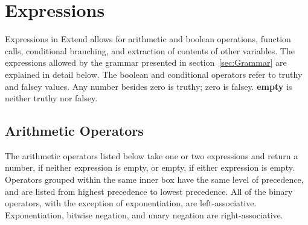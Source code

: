 \section{Expressions}
	Expressions in Extend allows for arithmetic and boolean operations, function calls, conditional branching, and extraction of contents of other variables. The expressions allowed by the grammar presented in section~\ref{sec:Grammar} are explained in detail below. The boolean and conditional operators refer to truthy and falsey values. Any number besides zero is truthy; zero is falsey. \textbf{empty} is neither truthy nor falsey. 
		\subsection{Arithmetic Operators} 
			The arithmetic operators listed below take one or two expressions and return a number, if neither expression is empty, or empty, if either expression is empty. Operators grouped within the same inner box have the same level of precedence, and are listed from highest precedence to lowest precedence. All of the binary operators, with the exception of exponentiation, are left-associative. Exponentiation, bitwise negation, and unary negation are right-associative.
